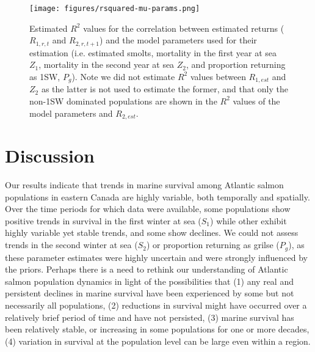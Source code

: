 \documentclass[12pt]{article}
\newcommand{\So}{$S_{1}$\xspace}
\newcommand{\St}{$S_{2}$\xspace}
\newcommand{\Pg}{$P_g$\xspace}
\begin{document}
\begin{figure}[htbp] \centering
    \texttt{[image: figures/rsquared-mu-params.png]}
    \caption{Estimated $R^2$ values for the correlation between estimated
        returns ($R_{1,r,t}$ and $R_{2,r,t+1}$) and the model parameters used
        for their estimation (i.e. estimated smolts, mortality in the first
        year at sea $Z_1$, mortality in the second year at sea $Z_2$, and
        proportion returning as 1SW, \Pg). Note we did not estimate $R^2$
        values between $R_{1,est}$ and $Z_2$ as the latter is not used to
        estimate the former, and that only the non-1SW dominated populations are
        shown in the $R^2$ values of the model parameters and $R_{2,est}$.}
    \label{fig:mu-rsq} 
\end{figure}


\section*{Discussion} 



Our results indicate that trends in marine survival among Atlantic salmon
populations in eastern Canada are highly variable, both temporally and
spatially. Over the time periods for which data were available, some
populations show positive trends in survival in the first winter at sea (\So)
while other exhibit highly variable yet stable trends, and some show declines.
We could not assess trends in the second winter at sea (\St) or proportion
returning as grilse (\Pg), as these parameter estimates were highly uncertain
and were strongly influenced by the priors. Perhaps there is a need to rethink
our understanding of Atlantic salmon population dynamics in light of the
possibilities that (1) any real and persistent declines in marine survival
have been experienced by some but not necessarily all populations, (2)
reductions in survival might have occurred over a relatively brief period of
time and have not persisted, (3) marine survival has been relatively stable,
or increasing in some populations for one or more decades, (4) variation in
survival at the population level can be large even within a region.
\end{document}
